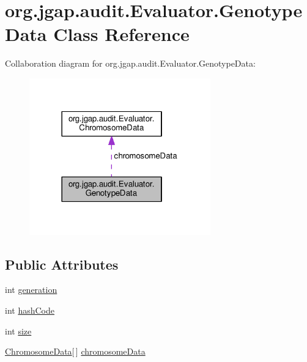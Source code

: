 \hypertarget{classorg_1_1jgap_1_1audit_1_1_evaluator_1_1_genotype_data}{\section{org.\-jgap.\-audit.\-Evaluator.\-Genotype\-Data Class Reference}
\label{classorg_1_1jgap_1_1audit_1_1_evaluator_1_1_genotype_data}
}


Collaboration diagram for org.\-jgap.\-audit.\-Evaluator.\-Genotype\-Data\-:
\nopagebreak
\begin{figure}[H]
\begin{center}
\leavevmode
\includegraphics[width=222pt]{classorg_1_1jgap_1_1audit_1_1_evaluator_1_1_genotype_data__coll__graph}
\end{center}
\end{figure}
\subsection*{Public Attributes}
\begin{DoxyCompactItemize}
\item 
int \hyperlink{classorg_1_1jgap_1_1audit_1_1_evaluator_1_1_genotype_data_a5290ac0e1221be8a3dc8f476345cf9cf}{generation}
\item 
int \hyperlink{classorg_1_1jgap_1_1audit_1_1_evaluator_1_1_genotype_data_aa1d091061dfca764d2e834a359b361d0}{hash\-Code}
\item 
int \hyperlink{classorg_1_1jgap_1_1audit_1_1_evaluator_1_1_genotype_data_aefc2b641dde439986c8f35147100c95c}{size}
\item 
\hyperlink{classorg_1_1jgap_1_1audit_1_1_evaluator_1_1_chromosome_data}{Chromosome\-Data}\mbox{[}$\,$\mbox{]} \hyperlink{classorg_1_1jgap_1_1audit_1_1_evaluator_1_1_genotype_data_ad8d0692df61f7aff7fa647c7f89bcd5e}{chromosome\-Data}
\end{DoxyCompactItemize}


